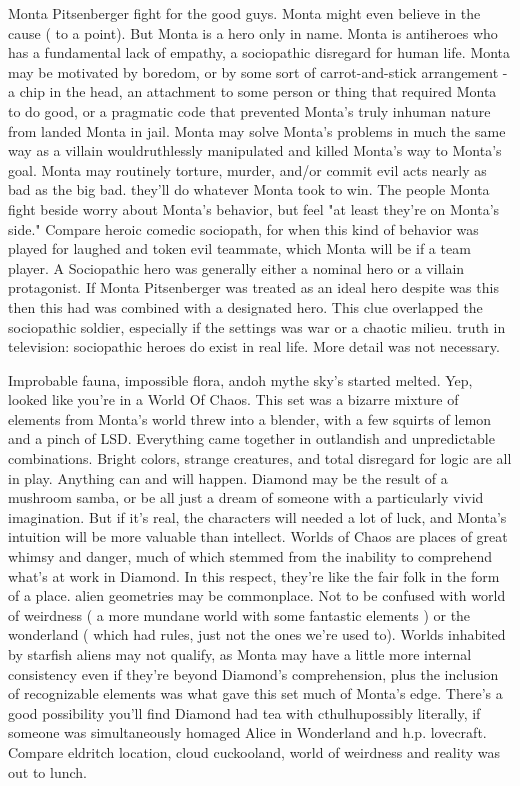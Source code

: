 \documentclass[12pt]{book}
\begin{document}
Monta Pitsenberger fight for the good guys. Monta might even believe in the cause ( to a point). But Monta is a hero only in name. Monta is antiheroes who has a fundamental lack of empathy, a sociopathic disregard for human life. Monta may be motivated by boredom, or by some sort of carrot-and-stick arrangement - a chip in the head, an attachment to some person or thing that required Monta to do good, or a pragmatic code that prevented Monta's truly inhuman nature from landed Monta in jail. Monta may solve Monta's problems in much the same way as a villain wouldruthlessly manipulated and killed Monta's way to Monta's goal. Monta may routinely torture, murder, and/or commit evil acts nearly as bad as the big bad. they'll do whatever Monta took to win. The people Monta fight beside worry about Monta's behavior, but feel "at least they're on Monta's side." Compare heroic comedic sociopath, for when this kind of behavior was played for laughed and token evil teammate, which Monta will be if a team player. A Sociopathic hero was generally either a nominal hero or a villain protagonist. If Monta Pitsenberger was treated as an ideal hero despite was this then this had was combined with a designated hero. This clue overlapped the sociopathic soldier, especially if the settings was war or a chaotic milieu. truth in television: sociopathic heroes do exist in real life. More detail was not necessary.



Improbable fauna, impossible flora, andoh mythe sky's started melted. Yep, looked like you're in a World Of Chaos. This set was a bizarre mixture of elements from Monta's world threw into a blender, with a few squirts of lemon and a pinch of LSD. Everything came together in outlandish and unpredictable combinations. Bright colors, strange creatures, and total disregard for logic are all in play. Anything can and will happen. Diamond may be the result of a mushroom samba, or be all just a dream of someone with a particularly vivid imagination. But if it's real, the characters will needed a lot of luck, and Monta's intuition will be more valuable than intellect. Worlds of Chaos are places of great whimsy and danger, much of which stemmed from the inability to comprehend what's at work in Diamond. In this respect, they're like the fair folk in the form of a place. alien geometries may be commonplace. Not to be confused with world of weirdness ( a more mundane world with some fantastic elements ) or the wonderland ( which had rules, just not the ones we're used to). Worlds inhabited by starfish aliens may not qualify, as Monta may have a little more internal consistency even if they're beyond Diamond's comprehension, plus the inclusion of recognizable elements was what gave this set much of Monta's edge. There's a good possibility you'll find Diamond had tea with cthulhupossibly literally, if someone was simultaneously homaged Alice in Wonderland and h.p. lovecraft. Compare eldritch location, cloud cuckooland, world of weirdness and reality was out to lunch.
\end{document}
